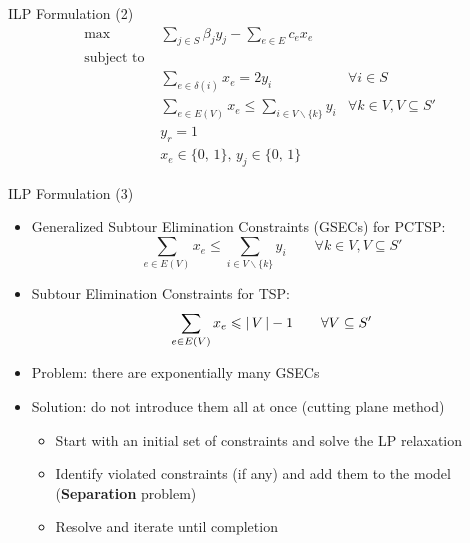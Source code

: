\documentclass[10pt]{beamer}
\begin{document}
\begin{frame}[t]{ILP Formulation (2)}
    \begin{align} 
        \text {max } \label{pctsp_obj}     & \sum_{j\in S} \beta_j y_j  -     \sum_{e\in E} c_e x_e &
        \\
        \text{subject to } \nonumber    &  & \\
        \label{const:pctsp1}               & \sum_{e \in \delta(i)} x_e = 2 y_{i}  & \forall i \in S \\
        \label{const:pctsp2}               & \sum_{e \in E(V) } x_e \leq \sum_{i \in V \backslash\{ k \}} y_{i} & \forall k \in V, V\subseteq S' \\
        \label{const:pctsp3}               & y_r = 1 \\
        \label{const:pctsp4}               & x_e \in \{0, \, 1\}, \, y_j \in \{0, \, 1\}  
    \end{align}
\end{frame}

\begin{frame}[t]{ILP Formulation (3)}
    \begin{itemize}
        \item<1-> Generalized Subtour Elimination Constraints (GSECs) for PCTSP:
        \[  \sum_{e \in E(V) } x_e \leq \sum_{i \in V \backslash\{ k \}} y_{i} \qquad \forall k \in V, V\subseteq S' \] 
        \item<2-> Subtour Elimination Constraints for TSP:
        \[  \sum_{e \in E(V) } x_e \leqslant \left| \, V \, \right| - 1 \qquad \forall V \subseteq S' \]         
        \item<2-> Problem: there are exponentially many GSECs
        \item<3-> Solution: do not introduce them all at once (cutting plane method)
            \begin{itemize}
                \item<5-> Start with an initial set of constraints and solve the LP relaxation
                \item<6-> Identify violated constraints (if any) and add them to the model (\textbf{Separation} problem)
                \item<7-> Resolve and iterate until completion
            \end{itemize}    
    \end{itemize}
\end{frame}
\end{document}
